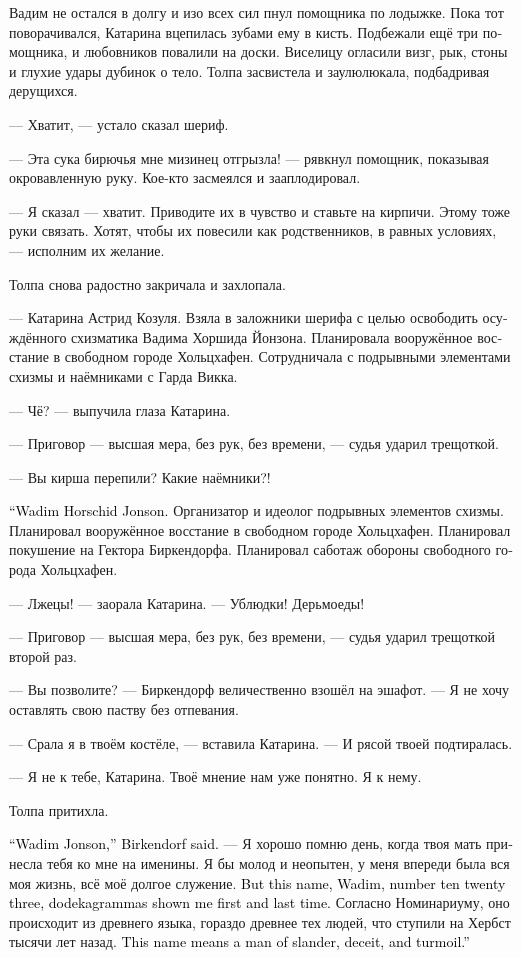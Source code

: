 \documentclass[a4paper,12pt,fleqn]{book}\usepackage{cooltooltips}\usepackage{polyglossia}\setdefaultlanguage[babelshorthands=true]{russian}\setotherlanguage{english}\defaultfontfeatures{Ligatures=TeX,Mapping=tex-text} \usepackage{xcolor}\definecolor{lightgray}{HTML}{bbbbbb}\color{lightgray}\newcommand{\ml}[3]{\textenglish{\textcolor{black}{#3}}}
\newcommand{\asterism}{\vspace{1em}{\centering\Large\bfseries$\ast~\ast~\ast$\par}\vspace{1em}}
\begin{document}
Вадим не остался в долгу и изо всех сил пнул помощника по лодыжке.
Пока тот поворачивался, Катарина вцепилась зубами ему в кисть.
Подбежали ещё три помощника, и любовников повалили на доски.
Виселицу огласили визг, рык, стоны и глухие удары дубинок о тело.
Толпа засвистела и заулюлюкала, подбадривая дерущихся.

--- Хватит, --- устало сказал шериф.

--- Эта сука бирючья мне мизинец отгрызла! --- рявкнул помощник, показывая окровавленную руку.
Кое-кто засмеялся и зааплодировал.

--- Я сказал --- хватит.
Приводите их в чувство и ставьте на кирпичи.
Этому тоже руки связать.
Хотят, чтобы их повесили как родственников, в равных условиях, --- исполним их желание.

Толпа снова радостно закричала и захлопала.

\asterism

--- Катарина Астрид Козуля.
Взяла в заложники шерифа с целью освободить осуждённого схизматика Вадима Хоршида Йонзона.
Планировала вооружённое восстание в свободном городе Хольцхафен.
Сотрудничала с подрывными элементами схизмы и наёмниками с Гарда Викка.

--- Чё? --- выпучила глаза Катарина.

--- Приговор --- высшая мера, без рук, без времени, --- судья ударил трещоткой.

--- Вы кирша перепили?
Какие наёмники?!

\ml{$0$}
{--- Вадим Хоршид Йонзон.}
{``Wadim Horschid Jonson.}
Организатор и идеолог подрывных элементов схизмы.
Планировал вооружённое восстание в свободном городе Хольцхафен.
Планировал покушение на Гектора Биркендорфа.
Планировал саботаж обороны свободного города Хольцхафен.

--- Лжецы! --- заорала Катарина.
--- Ублюдки!
Дерьмоеды!

--- Приговор --- высшая мера, без рук, без времени, --- судья ударил трещоткой второй раз.

--- Вы позволите? --- Биркендорф величественно взошёл на эшафот.
--- Я не хочу оставлять свою паству без отпевания.

--- Срала я в твоём костёле, --- вставила Катарина.
--- И рясой твоей подтиралась.

--- Я не к тебе, Катарина.
Твоё мнение нам уже понятно.
Я к нему.

Толпа притихла.

\ml{$0$}
{--- Вадим Йонзон, --- сказал Биркендорф.}
{``Wadim Jonson,'' Birkendorf said.}
--- Я хорошо помню день, когда твоя мать принесла тебя ко мне на именины.
Я бы молод и неопытен, у меня впереди была вся моя жизнь, всё моё долгое служение.
\ml{$0$}
{Но это имя --- Вадим, номер тысяча двадцать три --- додекаграммы показали мне первый и последний раз.}
{But this name, Wadim, number ten twenty three, dodekagrammas shown me first and last time.}
Согласно Номинариуму, оно происходит из древнего языка, гораздо древнее тех людей, что ступили на Хербст тысячи лет назад.
\ml{$0$}
{Это имя означает --- клеветник, обманщик и смутьян.}
{This name means a man of slander, deceit, and turmoil.''}
\end{document}
